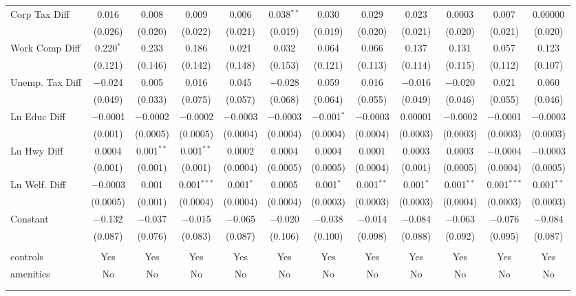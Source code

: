 \begin{table}[!htbp]
\begin{tabular}{@{\extracolsep{5pt}}lccccccccccc}
  Corp Tax Diff & 0.016 & 0.008 & 0.009 & 0.006 & 0.038$^{**}$ & 0.030 & 0.029 & 0.023 & 0.0003 & 0.007 & 0.00000 \\ 
  & (0.026) & (0.020) & (0.022) & (0.021) & (0.019) & (0.019) & (0.020) & (0.021) & (0.020) & (0.021) & (0.020) \\ 
  Work Comp Diff & 0.220$^{*}$ & 0.233 & 0.186 & 0.021 & 0.032 & 0.064 & 0.066 & 0.137 & 0.131 & 0.057 & 0.123 \\ 
  & (0.121) & (0.146) & (0.142) & (0.148) & (0.153) & (0.121) & (0.113) & (0.114) & (0.115) & (0.112) & (0.107) \\ 
  Unemp. Tax Diff & $-$0.024 & 0.005 & 0.016 & 0.045 & $-$0.028 & 0.059 & 0.016 & $-$0.016 & $-$0.020 & 0.021 & 0.060 \\ 
  & (0.049) & (0.033) & (0.075) & (0.057) & (0.068) & (0.064) & (0.055) & (0.049) & (0.046) & (0.055) & (0.046) \\ 
  Ln Educ Diff & $-$0.0001 & $-$0.0002 & $-$0.0002 & $-$0.0003 & $-$0.0003 & $-$0.001$^{*}$ & $-$0.0003 & 0.00001 & $-$0.0002 & $-$0.0001 & $-$0.0003 \\ 
  & (0.001) & (0.0005) & (0.0005) & (0.0004) & (0.0004) & (0.0004) & (0.0004) & (0.0003) & (0.0003) & (0.0003) & (0.0003) \\ 
  Ln Hwy Diff & 0.0004 & 0.001$^{**}$ & 0.001$^{**}$ & 0.0002 & 0.0004 & 0.0004 & 0.0001 & 0.0003 & 0.0003 & $-$0.0004 & $-$0.0003 \\ 
  & (0.001) & (0.001) & (0.001) & (0.0004) & (0.0005) & (0.0005) & (0.0004) & (0.001) & (0.0005) & (0.0004) & (0.0005) \\ 
  Ln Welf. Diff & $-$0.0003 & 0.001 & 0.001$^{***}$ & 0.001$^{*}$ & 0.0005 & 0.001$^{*}$ & 0.001$^{**}$ & 0.001$^{*}$ & 0.001$^{**}$ & 0.001$^{***}$ & 0.001$^{**}$ \\ 
  & (0.0005) & (0.001) & (0.0004) & (0.0004) & (0.0004) & (0.0003) & (0.0003) & (0.0003) & (0.0004) & (0.0003) & (0.0003) \\ 
  Constant & $-$0.132 & $-$0.037 & $-$0.015 & $-$0.065 & $-$0.020 & $-$0.038 & $-$0.014 & $-$0.084 & $-$0.063 & $-$0.076 & $-$0.084 \\ 
  & (0.087) & (0.076) & (0.083) & (0.087) & (0.106) & (0.100) & (0.098) & (0.088) & (0.092) & (0.095) & (0.087) \\ 
 \hline \\[-1.8ex] 
controls & Yes & Yes & Yes & Yes & Yes & Yes & Yes & Yes & Yes & Yes & Yes \\ 
amenities & No & No & No & No & No & No & No & No & No & No & No \\ 
\hline \\[-1.8ex] 
\hline 
\hline \\[-1.8ex] 
\end{tabular} 
\end{table} 
